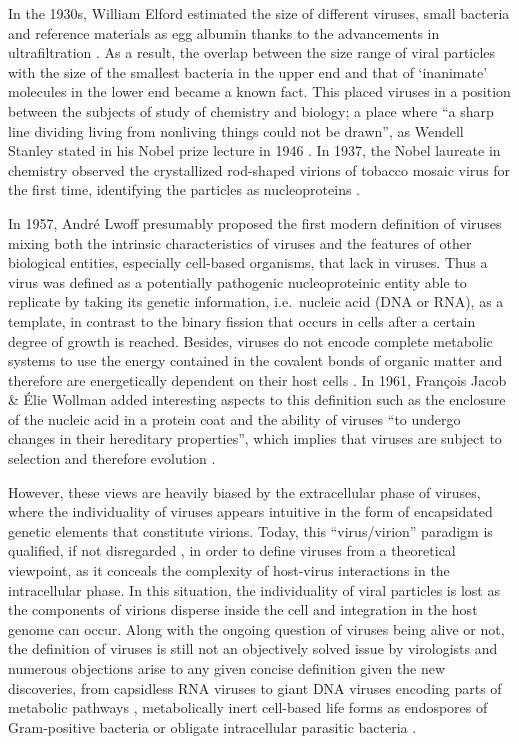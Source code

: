 \documentclass[
  openany]{book}
\begin{document}
In the 1930s, William Elford estimated the size of different viruses, small bacteria and reference materials as egg albumin thanks to the advancements in ultrafiltration \autocite{Elford1932}. As a result, the overlap between the size range of viral particles with the size of the smallest bacteria in the upper end and that of `inanimate' molecules in the lower end became a known fact. This placed viruses in a position between the subjects of study of chemistry and biology; a place where ``a sharp line dividing living from nonliving things could not be drawn'', as Wendell Stanley stated in his Nobel prize lecture in 1946 \autocite{Stanley1946}. In 1937, the Nobel laureate in chemistry observed the crystallized rod-shaped virions of tobacco mosaic virus for the first time, identifying the particles as nucleoproteins \autocite{Stanley1938}.

In 1957, André Lwoff presumably proposed the first modern definition of viruses mixing both the intrinsic characteristics of viruses and the features of other biological entities, especially cell-based organisms, that lack in viruses. Thus a virus was defined as a potentially pathogenic nucleoproteinic entity able to replicate by taking its genetic information, i.e.~nucleic acid (DNA or RNA), as a template, in contrast to the binary fission that occurs in cells after a certain degree of growth is reached. Besides, viruses do not encode complete metabolic systems to use the energy contained in the covalent bonds of organic matter and therefore are energetically dependent on their host cells \autocite{Lwoff1957}. In 1961, François Jacob \& Élie Wollman added interesting aspects to this definition such as the enclosure of the nucleic acid in a protein coat and the ability of viruses ``to undergo changes in their hereditary properties'', which implies that viruses are subject to selection and therefore evolution \autocite{Jacob1961}.

However, these views are heavily biased by the extracellular phase of viruses, where the individuality of viruses appears intuitive in the form of encapsidated genetic elements that constitute virions. Today, this ``virus/virion'' paradigm is qualified, if not disregarded \autocite{Forterre2016}, in order to define viruses from a theoretical viewpoint, as it conceals the complexity of host-virus interactions in the intracellular phase. In this situation, the individuality of viral particles is lost as the components of virions disperse inside the cell and integration in the host genome can occur. Along with the ongoing question of viruses being alive or not, the definition of viruses is still not an objectively solved issue by virologists and numerous objections arise to any given concise definition given the new discoveries, from capsidless RNA viruses \autocite{Dolja2012,Zhang2016} to giant DNA viruses encoding parts of metabolic pathways \autocite{Schvarcz2018}, metabolically inert cell-based life forms as endospores of Gram-positive bacteria \autocite{Galperin2012} or obligate intracellular parasitic bacteria \autocite{McClure2017}.
\end{document}
